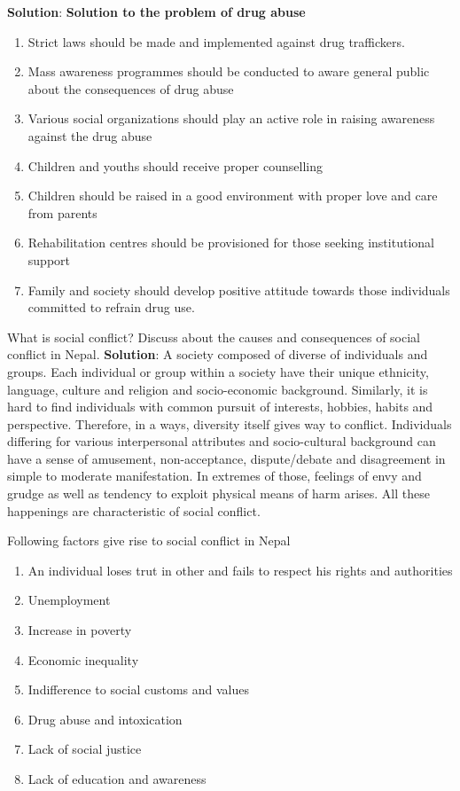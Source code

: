 \documentclass[
]{book}
\newcommand{\question}{\item}
\newenvironment{solution}{ {\bfseries Solution}:}{}
\begin{document}
\begin{questions}
\begin{solution}
\textbf{Solution to the problem of drug abuse}
\begin{enumerate}
\item Strict laws should be made and implemented against drug traffickers.
\item Mass awareness programmes should be conducted to aware general public about the consequences of drug abuse
\item Various social organizations should play an active role in raising awareness against the drug abuse
\item Children and youths should receive proper counselling
\item Children should be raised in a good environment with proper love and care from parents
\item Rehabilitation centres should be provisioned for those seeking institutional support
\item Family and society should develop positive attitude towards those individuals committed to refrain drug use.
\end{enumerate}
\end{solution}

\question What is social conflict? Discuss about the causes and consequences of social conflict in Nepal.
\begin{solution}
A society composed of diverse of individuals and groups. Each individual or group within a society have their unique ethnicity, language, culture and religion and socio-economic background. Similarly, it is hard to find individuals with common pursuit of interests, hobbies, habits and perspective. Therefore, in a ways, diversity itself gives way to conflict. Individuals differing for various interpersonal attributes and socio-cultural background can have a sense of amusement, non-acceptance, dispute/debate and disagreement in simple to moderate manifestation. In extremes of those, feelings of envy and grudge as well as tendency to exploit physical means of harm arises. All these happenings are characteristic of social conflict.

Following factors give rise to social conflict in Nepal

\begin{enumerate}
\item An individual loses trut in other and fails to respect his rights and authorities
\item Unemployment
\item Increase in poverty
\item Economic inequality
\item Indifference to social customs and values
\item Drug abuse and intoxication
\item Lack of social justice
\item Lack of education and awareness
\end{enumerate}


\end{solution}
\end{questions}
\end{document}
